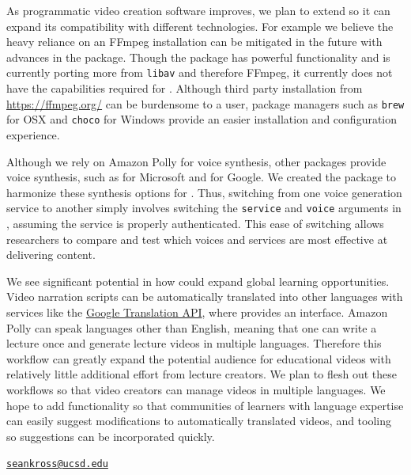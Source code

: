 As programmatic video creation software improves, we plan to extend
 so it can expand its compatibility with different
technologies. For example we believe the heavy reliance on an FFmpeg
installation can be mitigated in the future with advances in the
 package. Though the  package has powerful functionality
and is currently porting more from \texttt{libav} and therefore FFmpeg,
it currently does not have the capabilities required for .
Although third party installation from \url{https://ffmpeg.org/} can be
burdensome to a user, package managers such as \texttt{brew} for OSX and
\texttt{choco} for Windows provide an easier installation and
configuration experience.

Although we rely on Amazon Polly for voice synthesis, other packages
provide voice synthesis, such as  for Microsoft and
 for Google. We created the 
package to harmonize these synthesis options for . Thus,
switching from one voice generation service to another simply involves
switching the \texttt{service} and \texttt{voice} arguments in
, assuming the service is properly authenticated. This ease of
switching allows researchers to compare and test which voices and
services are most effective at delivering content.

We see significant potential in how  could expand global
learning opportunities. Video narration scripts can be automatically
translated into other languages with services like the
\href{https://cloud.google.com/translate/docs/}{Google Translation API},
where  provides an interface. Amazon Polly can
speak languages other than English, meaning that one can write a lecture
once and generate lecture videos in multiple languages. Therefore this
workflow can greatly expand the potential audience for educational
videos with relatively little additional effort from lecture creators.
We plan to flesh out these workflows so that video creators can manage
videos in multiple languages. We hope to add functionality so that
communities of learners with language expertise can easily suggest
modifications to automatically translated videos, and tooling so
suggestions can be incorporated quickly.




\address{%
Sean Kross\\
Department of Cognitive Science, University of California, San Diego\\
9500 Gilman Dr.\\ La Jolla, CA 92093\\
}
\href{mailto:seankross@ucsd.edu}{\nolinkurl{seankross@ucsd.edu}}

